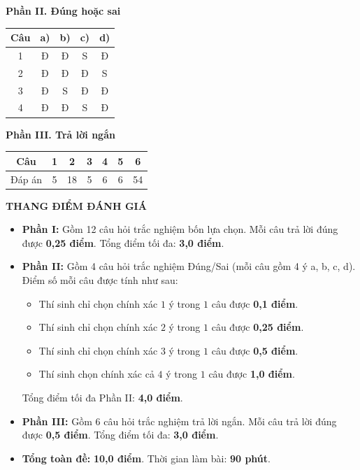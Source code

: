 \documentclass[12pt,a4paper]{article}
\begin{document}
\textbf{Phần II. Đúng hoặc sai}
\begin{center}
\renewcommand{\arraystretch}{1.4}
\begin{tabular}{|c|c|c|c|c|}\hline
Câu & a) & b) & c) & d)\\\hline
1 & Đ & Đ & S & Đ\\\hline
2 & Đ & Đ & Đ & S\\\hline
3 & Đ & S & Đ & Đ\\\hline
4 & Đ & Đ & S & Đ\\\hline
\end{tabular}
\end{center}

\textbf{Phần III. Trả lời ngắn}
\begin{center}
\renewcommand{\arraystretch}{1.5}
\begin{tabular}{|c|c|c|c|c|c|c|}\hline
Câu & 1 & 2 & 3 & 4 & 5 & 6\\\hline
Đáp án & 5 & 18 & 5 & 6 & 6 & 54 \\\hline
\end{tabular}
\end{center}

\vspace{5pt}
\begin{center}
\textbf{THANG ĐIỂM ĐÁNH GIÁ}
\end{center}
\begin{itemize}[leftmargin=*,itemsep=2pt]
\item \textbf{Phần I:} Gồm 12 câu hỏi trắc nghiệm bốn lựa chọn. Mỗi câu trả lời đúng được \textbf{0,25 điểm}. Tổng điểm tối đa: \textbf{3,0 điểm}.
\item \textbf{Phần II:} Gồm 4 câu hỏi trắc nghiệm Đúng/Sai (mỗi câu gồm 4 ý a, b, c, d). Điểm số mỗi câu được tính như sau:
\begin{itemize}[leftmargin=2cm]
\item Thí sinh chỉ chọn chính xác $1$ ý trong $1$ câu được \textbf{0,1 điểm}.
\item Thí sinh chỉ chọn chính xác $2$ ý trong $1$ câu được \textbf{0,25 điểm}.
\item Thí sinh chỉ chọn chính xác $3$ ý trong $1$ câu được \textbf{0,5 điểm}.
\item Thí sinh chọn chính xác cả $4$ ý trong $1$ câu được \textbf{1,0 điểm}.
\end{itemize}
Tổng điểm tối đa Phần II: \textbf{4,0 điểm}.
\item \textbf{Phần III:} Gồm 6 câu hỏi trắc nghiệm trả lời ngắn. Mỗi câu trả lời đúng được \textbf{0,5 điểm}. Tổng điểm tối đa: \textbf{3,0 điểm}.
\item \textbf{Tổng toàn đề:} \textbf{10,0 điểm}. Thời gian làm bài: \textbf{90 phút}.
\end{itemize}
\end{document}
